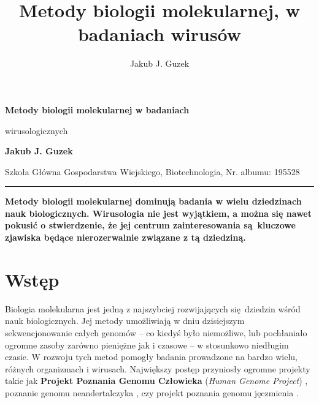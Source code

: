 \documentclass[two column, twoside, a4paper]{article}
\title{Metody biologii molekularnej, w badaniach wirusów}
\author{Jakub J. Guzek}
\date{}
\begin{document}
\begin{strip}
{\sc \bfseries \huge {}\selectfont Metody biologii molekularnej w badaniach

\vspace{3pt} wirusologicznych} \vspace{\baselineskip}

{\bfseries \Large Jakub J. Guzek}

{Szkoła Główna Gospodarstwa Wiejskiego, Biotechnologia, Nr. albumu: 195528}\vspace{\baselineskip}

\hrule
\end{strip}

\textbf{Metody biologii molekularnej dominują badania w wielu dziedzinach nauk biologicznych. Wirusologia nie jest wyjątkiem, a można się nawet pokusić o stwierdzenie, że jej centrum zainteresowania są kluczowe zjawiska będące nierozerwalnie związane z tą dziedziną.}

\section{Wstęp}

Biologia molekularna jest jedną z najszybciej rozwijających się dziedzin wśród nauk biologicznych. Jej metody umożliwiają w dniu dzisiejszym sekwencjonowanie całych genomów -- co kiedyś było niemożliwe, lub pochłaniało ogromne zasoby zarówno pieniężne jak i czasowe -- w stosunkowo niedługim czasie. W rozwoju tych metod pomogły badania prowadzone na bardzo wielu, różnych organizmach i wirusach. Największy postęp przyniosły ogromne projekty takie jak \textbf{Projekt Poznania Genomu Człowieka} (\textit{Human Genome Project}) \autocite{IHGSC2001}, poznanie genomu neandertalczyka \autocite{Prufer2014}, czy projekt poznania genomu jęczmienia \autocite{IBGSC2012}.
\end{document}
